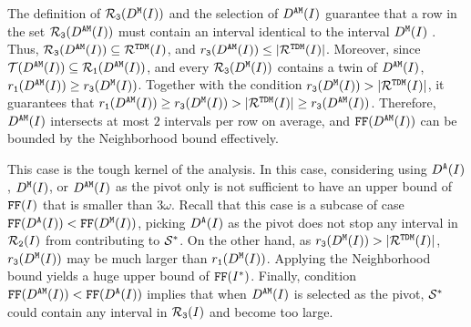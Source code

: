 The definition of $\mathcal{R}_\texttt{3}(D^\texttt{M}(I))$ and the selection of $D^\texttt{AM}(I)$ guarantee that a row in the set $\mathcal{R}_\texttt{3}(D^\texttt{AM}(I))$ must contain an interval identical to the interval $D^\texttt{M}(I)$ .
Thus, $\mathcal{R}_\texttt{3}(D^\texttt{AM}(I)) \subseteq \mathcal{R}^{\texttt{TDM}}(I)$, and $r_\texttt{3}(D^\texttt{AM}(I)) \leq |\mathcal{R}^{\texttt{TDM}}(I)|$.
Moreover, since $\mathcal{T}(D^\texttt{AM}(I)) \subseteq \mathcal{R}_\texttt{1}(D^\texttt{AM}(I))$, and every $\mathcal{R}_\texttt{3}(D^\texttt{M}(I))$ contains a twin of $D^\texttt{AM}(I)$, $r_\texttt{1}(D^\texttt{AM}(I)) \geq r_\texttt{3}(D^\texttt{M}(I))$. 
Together with the condition $r_\texttt{3}(D^\texttt{M}(I)) > |\mathcal{R}^{\texttt{TDM}}(I)|$, it guarantees that 
$r_\texttt{1}(D^\texttt{AM}(I)) \geq r_\texttt{3}(D^\texttt{M}(I)) > |\mathcal{R}^{\texttt{TDM}}(I)| \geq r_\texttt{3}(D^\texttt{AM}(I))$.
Therefore, $D^\texttt{AM}(I)$ intersects at most $2$ intervals per row on average, and $\text{\texttt{FF}}(D^\texttt{AM}(I))$ can be bounded by the Neighborhood bound effectively.



This case is the tough kernel of the analysis.
In this case, considering using $D^\texttt{A}(I)$, $D^\texttt{M}(I)$, or $D^\texttt{AM}(I)$ as the pivot only is not sufficient to have an upper bound of $\text{\texttt{FF}}(I)$ that is smaller than $3\omega$.
Recall that this case is a subcase of case $\text{\texttt{FF}}(D^\texttt{A}(I)) < \text{\texttt{FF}}(D^\texttt{M}(I))$, picking $D^\texttt{A}(I)$ as the pivot does not stop any interval in $\mathcal{R}_\texttt{2}(I)$ from contributing to $\mathcal{S}^*$. 
On the other hand, as $r_\texttt{3}(D^\texttt{M}(I)) > |\mathcal{R}^{\texttt{TDM}}(I)|$, $r_\texttt{3}(D^\texttt{M}(I))$ may be much larger than $r_\texttt{1}(D^\texttt{M}(I))$.
Applying the Neighborhood bound yields a huge upper bound of $\text{\texttt{FF}}(I^*)$.
Finally, condition $\text{\texttt{FF}}(D^\texttt{AM}(I)) < \text{\texttt{FF}}(D^\texttt{A}(I))$ implies that when $D^\texttt{AM}(I)$ is selected as the pivot, $\mathcal{S}^*$ could contain any interval in $\mathcal{R}_\texttt{3}(I)$ and become too large.


